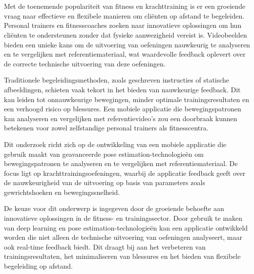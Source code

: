 
\chapter{}%
\label{ch:inleiding}

Met de toenemende populariteit van fitness en krachttraining is er een groeiende vraag naar effectieve en flexibele manieren om cliënten op afstand te begeleiden. 
Personal trainers en fitnesscoaches zoeken naar innovatieve oplossingen om hun cliënten te ondersteunen zonder dat fysieke aanwezigheid vereist is. 
Videobeelden bieden een unieke kans om de uitvoering van oefeningen nauwkeurig te \mbox{analyseren} en te vergelijken met referentiemateriaal, wat waardevolle feedback oplevert over de correcte technische uitvoering van deze oefeningen.

\medskip

Traditionele begeleidingsmethoden, zoals geschreven instructies of statische \mbox{afbeeldingen}, schieten vaak tekort in het bieden van nauwkeurige feedback. 
Dit kan leiden tot onnauwkeurige bewegingen, minder optimale trainingsresultaten en een verhoogd risico op blessures. 
Een mobiele applicatie die bewegingspatronen kan analyseren en vergelijken met referentievideo’s zou een doorbraak kunnen betekenen voor zowel zelfstandige personal trainers als fitnesscentra.

\medskip

Dit onderzoek richt zich op de ontwikkeling van een mobiele applicatie die gebruik maakt van geavanceerde pose estimation-technologieën om bewegingspatronen te analyseren en te vergelijken met referentiemateriaal. De focus ligt op krachttrainingsoefeningen, waarbij de applicatie feedback geeft over de nauwkeurigheid van de uitvoering op basis van parameters zoals gewrichtshoeken en bewegingssnelheid.

\medskip

De keuze voor dit onderwerp is ingegeven door de groeiende behoefte aan innovatieve oplossingen in de fitness- en trainingssector. Door gebruik te maken van deep learning en pose estimation-technologieën kan een applicatie ontwikkeld worden die niet alleen de technische uitvoering van oefeningen analyseert, maar ook real-time feedback biedt. Dit draagt bij aan het verbeteren van trainingsresultaten, het minimaliseren van blessures en het bieden van flexibele begeleiding op afstand.

